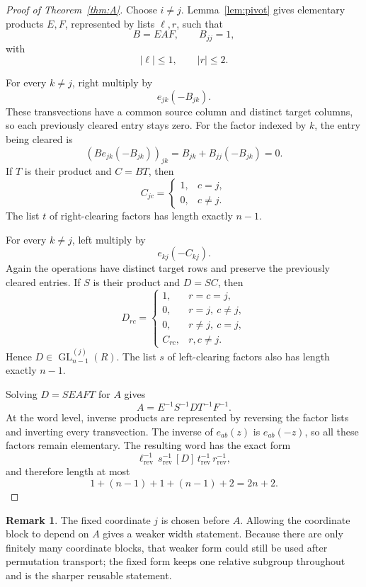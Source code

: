 \documentclass[11pt]{amsart}
\theoremstyle{definition}
\newtheorem{remark}[theorem]{Remark}
\theoremstyle{plain}
\newcommand{\GL}{\operatorname{GL}}
\newcommand{\abs}[1]{\left\lvert#1\right\rvert}
\begin{document}
\begin{proof}[Proof of Theorem~\ref{thm:A}]
Choose \(i\ne j\).  Lemma~\ref{lem:pivot} gives elementary products
\(E,F\), represented by lists \(\ell,r\), such that
\[
  B=EAF,\qquad B_{jj}=1,
\]
with
\[
  \abs\ell\le1,\qquad \abs r\le2.
\]

For every \(k\ne j\), right multiply by
\[
  e_{jk}(-B_{jk}).
\]
These transvections have a common source column and distinct target
columns, so each previously cleared entry stays zero.  For the factor
indexed by \(k\), the entry being cleared is
\[
 (Be_{jk}(-B_{jk}))_{jk}
 =B_{jk}+B_{jj}(-B_{jk})=0.
\]
If \(T\) is
their product and \(C=BT\), then
\[
  C_{jc}=\begin{cases}1,&c=j,\\0,&c\ne j.\end{cases}
\]
The list \(t\) of right-clearing factors has length exactly \(n-1\).

For every \(k\ne j\), left multiply by
\[
  e_{kj}(-C_{kj}).
\]
Again the operations have distinct target rows and preserve the
previously cleared entries.
If \(S\) is their product and \(D=SC\), then
\[
  D_{rc}=
  \begin{cases}
    1,&r=c=j,\\
    0,&r=j,\ c\ne j,\\
    0,&r\ne j,\ c=j,\\
    C_{rc},&r,c\ne j.
  \end{cases}
\]
Hence \(D\in\GL_{n-1}^{(j)}(R)\).  The list \(s\) of
left-clearing factors also has length exactly \(n-1\).

Solving \(D=SEAF T\) for \(A\) gives
\[
  A=E^{-1}S^{-1}DT^{-1}F^{-1}.
\]
At the word level, inverse products are represented by reversing
the factor lists and inverting every transvection.  The inverse of
\(e_{ab}(z)\) is \(e_{ab}(-z)\), so all these factors remain
elementary.  The resulting word has the exact form
\[
  \ell^{-1}_{\mathrm{rev}}\,
  s^{-1}_{\mathrm{rev}}\,
  [D]\,
  t^{-1}_{\mathrm{rev}}\,
  r^{-1}_{\mathrm{rev}},
\]
and therefore length at most
\[
  1+(n-1)+1+(n-1)+2=2n+2.
\]
\end{proof}

\begin{remark}
The fixed coordinate \(j\) is chosen before \(A\).  Allowing the
coordinate block to depend on \(A\) gives a weaker width statement.
Because there are only finitely many coordinate blocks, that weaker
form could still be used after permutation transport; the fixed form
keeps one relative subgroup throughout and is the sharper reusable
statement.
\end{remark}
\end{document}
